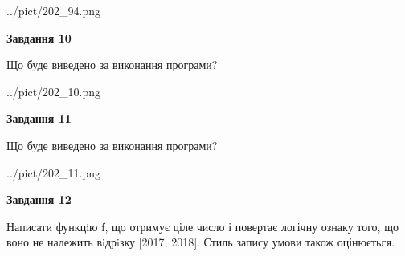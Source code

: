 \documentclass[12pt, ukrainian]{article}
\begin{document}
{\begin {large}
\begin{center}
	{../pict/202_94.png}
\end{center}
\newpage

{\begin {center}\textbf{Завдання 10}\end {center}}

Що буде виведено за виконання програми?\par
\begin{center}
	{../pict/202_10.png}
\end{center}
\newpage

{\begin {center}\textbf{Завдання 11}\end {center}}

Що буде виведено за виконання програми?\par
\begin{center}
	{../pict/202_11.png}
\end{center}
\newpage

{\begin {center}\textbf{Завдання 12}\end {center}}


Написати функцiю f, що отримує ціле число і повертає логічну ознаку того, що воно не належить вiдрiзку [2017; 2018]. Стиль запису умови також оцінюється.\par
\newpage

\end {large}}
\end{document}
